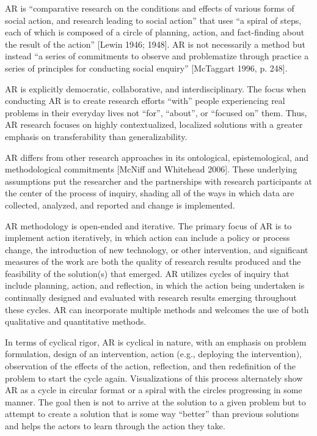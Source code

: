 AR is “comparative research on the conditions and effects of various forms of social action, and research leading to social action” that uses “a spiral of steps, each of which is composed of a circle of planning, action, and fact-finding about the result of the action” [Lewin 1946; 1948]. AR is not necessarily a method but instead “a series of commitments to observe and problematize through practice a series of principles for conducting social enquiry” [McTaggart 1996, p. 248]. 

AR is explicitly democratic, collaborative, and interdisciplinary. The focus when conducting AR is to create research efforts “with” people experiencing real problems in their everyday lives not “for”, “about”, or “focused on” them. Thus, AR research focuses on highly contextualized, localized solutions with a greater emphasis on transferability than generalizability.

AR differs from other research approaches in its ontological, epistemological, and methodological commitments [McNiff and Whitehead 2006]. These underlying assumptions put the researcher and the partnerships with research participants at the center of the process of inquiry, shading all of the ways in which data are collected, analyzed, and reported and change is implemented.

AR methodology is open-ended and iterative. The primary focus of AR is to implement action iteratively, in which action can include a policy or process change, the introduction of new technology, or other intervention, and significant measures of the work are both the quality of research results produced and the feasibility of the solution(s) that emerged. AR utilizes cycles of inquiry that include planning, action, and reflection, in which the action being undertaken is continually designed and evaluated with research results emerging throughout these cycles. AR can incorporate multiple methods and welcomes the use of both qualitative and quantitative methods.

In terms of cyclical rigor, AR is cyclical in nature, with an emphasis on problem formulation, design of an intervention, action (e.g., deploying the intervention), observation of the effects of the action, reflection, and then redefinition of the problem to start the cycle again. Visualizations of this process alternately show AR as a cycle in circular format or a spiral with the circles progressing in some manner. The goal then is not to arrive at the solution to a given problem but to attempt to create a solution that is some way “better” than previous solutions and helps the actors to learn through the action they take.

